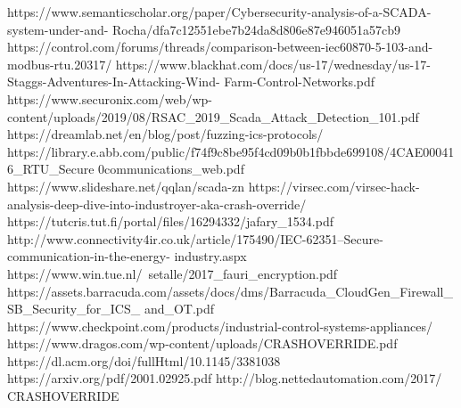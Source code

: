 https://www.semanticscholar.org/paper/Cybersecurity-analysis-of-a-SCADA-system-under-and-
Rocha/dfa7c12551ebe7b24da8d806e87e946051a57cb9
https://control.com/forums/threads/comparison-between-iec60870-5-103-and-modbus-rtu.20317/
https://www.blackhat.com/docs/us-17/wednesday/us-17-Staggs-Adventures-In-Attacking-Wind-
Farm-Control-Networks.pdf
https://www.securonix.com/web/wp-
content/uploads/2019/08/RSAC_2019_Scada_Attack_Detection_101.pdf
https://dreamlab.net/en/blog/post/fuzzing-ics-protocols/
https://library.e.abb.com/public/f74f9c8be95f4cd09b0b1fbbde699108/4CAE000416_RTU_Secure%
0communications_web.pdf
https://www.slideshare.net/qqlan/scada-zn
https://virsec.com/virsec-hack-analysis-deep-dive-into-industroyer-aka-crash-override/
https://tutcris.tut.fi/portal/files/16294332/jafary_1534.pdf
http://www.connectivity4ir.co.uk/article/175490/IEC-62351--Secure-communication-in-the-energy-
industry.aspx
https://www.win.tue.nl/~setalle/2017_fauri_encryption.pdf
https://assets.barracuda.com/assets/docs/dms/Barracuda_CloudGen_Firewall_SB_Security_for_ICS_
and_OT.pdf
https://www.checkpoint.com/products/industrial-control-systems-appliances/
https://www.dragos.com/wp-content/uploads/CRASHOVERRIDE.pdf
https://dl.acm.org/doi/fullHtml/10.1145/3381038
https://arxiv.org/pdf/2001.02925.pdf
http://blog.nettedautomation.com/2017/
CRASHOVERRIDE

